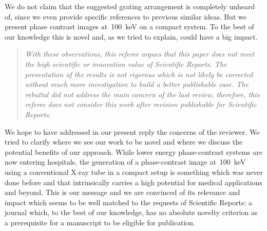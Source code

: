 \documentclass[a4paper,english]{scrartcl}
\newenvironment{reviewerquote}{\begin{quote}\itshape}{\end{quote}}
\begin{document}
We do not claim that the
suggested grating arrangement is completely unheard of, since we even
provide specific references to previous similar ideas. But we present  phase
contrast images at~\SI{100}{\kilo\eV}
on a compact system. To the best of our knowledge this is novel and, as
we tried to explain, could have a big impact.

\begin{reviewerquote}
With these observations, this referee argues that this paper
does not meet the high scientific or innovation value of Scientific Reports.
The presentation of the results is not rigorous which is not likely be
corrected without much more investigation to build a better publishable
case. The rebuttal did not address the main concern of the last review,
therefore, this referee does not consider this work after revision
publishable for Scientific Reports.
\end{reviewerquote}

We hope to have addressed in our present reply the
concerns of the reviewer. We tried to clarify where we see our work to be
novel and where we discuss the potential benefits of our approach. While
lower energy phase-contrast systems are now entering hospitals, the
generation of a phase-contrast image at~\SI{100}{\kilo\eV} using a conventional X-ray
tube in a compact setup is something which was never done before and that
intrinsically carries a high potential for medical applications and beyond.
This is our message and we are convinced of its relevance and impact which
seems to be well matched to the requests of Scientific Reports: a journal
which, to the best of our knowledge, has no absolute novelty criterion as a
prerequisite for a manuscript to be eligible for publication.
\end{document}
